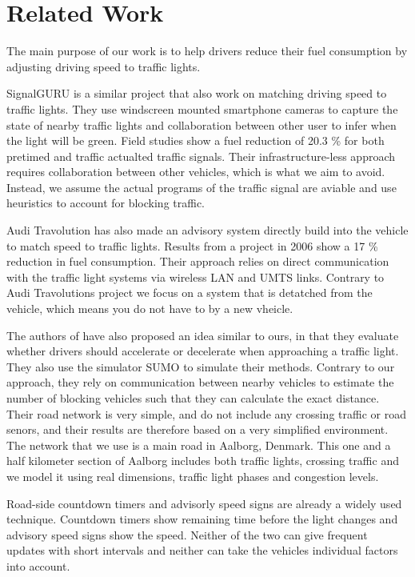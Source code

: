 \section{Related Work}\label{sec:RelatedWork}
The main purpose of our work is to help drivers reduce their fuel consumption by adjusting driving speed to traffic lights.

SignalGURU\cite{SignalGURU} is a similar project that also work on matching driving speed to traffic lights.
They use windscreen mounted smartphone cameras to capture the state of nearby traffic lights and collaboration between other user to infer when the light will be green.
Field studies show a fuel reduction of 20.3 \% for both pretimed and traffic actualted traffic signals.
Their infrastructure-less approach requires collaboration between other vehicles, which is what we aim to avoid.
Instead, we assume the actual programs of the traffic signal are aviable and use heuristics to account for blocking traffic.

Audi Travolution\cite{audi} has also made an advisory system directly build into the vehicle to match speed to traffic lights.
Results from a project in 2006 show a 17 \% reduction in fuel consumption.
Their approach relies on direct communication with the traffic light systems via wireless LAN and UMTS links.
Contrary to Audi Travolutions project we focus on a system that is detatched from the vehicle, which means you do not have to by a new vheicle.

The authors of \cite{VANETsim} have also proposed an idea similar to ours, in that they evaluate whether drivers should accelerate or decelerate when approaching a traffic light.
They also use the simulator SUMO to simulate their methods.
Contrary to our approach, they rely on communication between nearby vehicles to estimate the number of blocking vehicles such that they can calculate the exact distance.
Their road network is very simple, and do not include any crossing traffic or road senors, and their results are therefore based on a very simplified environment. 
The network that we use is a main road in Aalborg, Denmark. 
This one and a half kilometer section of Aalborg includes both traffic lights, crossing traffic and we model it using real dimensions, traffic light phases and congestion levels.

Road-side countdown timers and advisorly speed signs\cite{transyt} are already a widely used technique.
Countdown timers show remaining time before the light changes and advisory speed signs show the speed.
Neither of the two can give frequent updates with short intervals and neither can take the vehicles individual factors into account.

